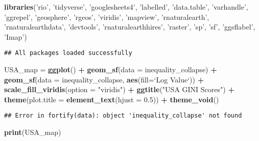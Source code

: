 \documentclass[
]{article}
\newenvironment{Shaded}{\begin{snugshade}}{\end{snugshade}}
\newcommand{\DataTypeTok}[1]{\textcolor[rgb]{0.13,0.29,0.53}{#1}}
\newcommand{\FloatTok}[1]{\textcolor[rgb]{0.00,0.00,0.81}{#1}}
\newcommand{\KeywordTok}[1]{\textcolor[rgb]{0.13,0.29,0.53}{\textbf{#1}}}
\newcommand{\NormalTok}[1]{#1}
\newcommand{\OperatorTok}[1]{\textcolor[rgb]{0.81,0.36,0.00}{\textbf{#1}}}
\newcommand{\StringTok}[1]{\textcolor[rgb]{0.31,0.60,0.02}{#1}}
\begin{document}
\begin{Shaded}
\begin{Highlighting}[]
\KeywordTok{libraries}\NormalTok{(}\StringTok{'rio'}\NormalTok{, }\StringTok{'tidyverse'}\NormalTok{, }\StringTok{'googlesheets4'}\NormalTok{, }\StringTok{'labelled'}\NormalTok{, }\StringTok{'data.table'}\NormalTok{,}
          \StringTok{'varhandle'}\NormalTok{, }\StringTok{'ggrepel'}\NormalTok{, }\StringTok{'geosphere'}\NormalTok{, }\StringTok{'rgeos'}\NormalTok{, }\StringTok{'viridis'}\NormalTok{, }\StringTok{'mapview'}\NormalTok{,}
          \StringTok{'rnaturalearth'}\NormalTok{, }\StringTok{'rnaturalearthdata'}\NormalTok{, }\StringTok{'devtools'}\NormalTok{, }\StringTok{'rnaturalearthhires'}\NormalTok{,}
          \StringTok{'raster'}\NormalTok{, }\StringTok{'sp'}\NormalTok{, }\StringTok{'sf'}\NormalTok{, }\StringTok{'ggsflabel'}\NormalTok{, }\StringTok{'Imap'}\NormalTok{)}
\end{Highlighting}
\end{Shaded}

\begin{verbatim}
## All packages loaded successfully
\end{verbatim}

\begin{Shaded}
\begin{Highlighting}[]
\NormalTok{USA_map =}\StringTok{ }\KeywordTok{ggplot}\NormalTok{() }\OperatorTok{+}
\KeywordTok{geom_sf}\NormalTok{(}\DataTypeTok{data =}\NormalTok{ inequality_collapse) }\OperatorTok{+}
\KeywordTok{geom_sf}\NormalTok{(}\DataTypeTok{data =}\NormalTok{ inequality_collapse, }\KeywordTok{aes}\NormalTok{(}\DataTypeTok{fill=}\StringTok{`}\DataTypeTok{Log Value}\StringTok{`}\NormalTok{)) }\OperatorTok{+}
\KeywordTok{scale_fill_viridis}\NormalTok{(}\DataTypeTok{option =} \StringTok{"viridis"}\NormalTok{) }\OperatorTok{+}
\KeywordTok{ggtitle}\NormalTok{(}\StringTok{"USA GINI Scores"}\NormalTok{) }\OperatorTok{+}
\KeywordTok{theme}\NormalTok{(}\DataTypeTok{plot.title =} \KeywordTok{element_text}\NormalTok{(}\DataTypeTok{hjust =} \FloatTok{0.5}\NormalTok{)) }\OperatorTok{+}
\KeywordTok{theme_void}\NormalTok{()}
\end{Highlighting}
\end{Shaded}

\begin{verbatim}
## Error in fortify(data): object 'inequality_collapse' not found
\end{verbatim}

\begin{Shaded}
\begin{Highlighting}[]
\KeywordTok{print}\NormalTok{(USA_map)}
\end{Highlighting}
\end{Shaded}
\end{document}
